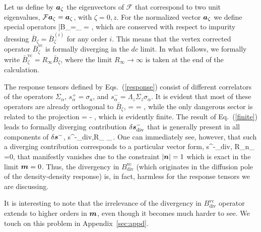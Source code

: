 Let us define by $\boldsymbol{a}_\zeta$ the eigenvectors of $\mathcal{F}$ that correspond to two unit eigenvalues, $\mathcal{F}\boldsymbol{a}_\zeta=\boldsymbol{a}_\zeta$, with $\zeta=0, z$. For the  normalized vector $\boldsymbol{a}_\zeta$ we define special operators
\be
\label{Bdiv}
\bar{B}_\zeta=_\zeta \cdot {} 
= ,
\e
which are conserved with respect to impurity dressing $\bar{B}_\zeta=\bar{B}_\zeta^{(i)}$ for any order $i$. This means that the vertex corrected operator $\bar{B}_\zeta^\textrm{vc}$ is formally diverging in the $dc$ limit. In what follows, we formally write $\bar{B}_\zeta^{\text{vc}} = R_\infty \bar{B}_\zeta$, where the limit $R_\infty \to \infty$ is taken at the end of the calculation.

The response tensors defined by Eqs.~(\ref{response}) consist of different correlators of the operators $\Sigma_\alpha$, $s^+_\alpha=\sigma_a$, and $s^-_\alpha = \Lambda_z\Sigma_z\sigma_\alpha$. It is evident that most of these operators are already orthogonal to $\bar{B}_\zeta$,
\be
\tr {} = \tr {}= \tr {},
\e
while the only dangerous sector is related to the projection
\be
\label{finite}
\tr {} = - ,
\e
which is evidently finite. The result of Eq.~(\ref{finite}) leads to formally diverging contribution $\delta \boldsymbol{s}^-_\textrm{div}$ that is generally present in all components of $\delta \boldsymbol{s}^-$, 
\be
\delta s^{-}_{\textrm{div},\alpha}\propto  R_\infty
\s_\beta {}  \,.
\e
One can immediately see, however, that such a diverging contribution corresponds to a particular vector form,
\be
\label{divergence}
\delta s^{-}_{\textrm{div},\alpha} \propto R_\infty n_\alpha\, \cdot{} =0,
\e
that manifestly vanishes due to the constraint $|\boldsymbol{n}|=1$ which is exact in the limit $\boldsymbol{m}=0$. Thus, the divergency in $B_\textrm{div}^\textrm{vc}$ (which originates in the diffusion pole of the density-density response) is, in fact, harmless for the response 
tensors we are discussing. 

It is interesting to note that the irrelevance of the divergency in $B_\textrm{div}^\textrm{vc}$ operator extends to higher orders in $\boldsymbol{m}$, even though it becomes much harder to see. We touch on this problem in Appendix~\ref{sec:appd}. 

